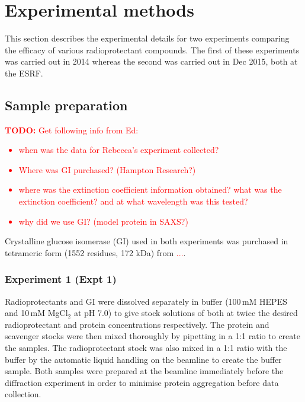 \section{Experimental methods}
\label{sec:Experimental methods - SAXS}
This section describes the experimental details for two experiments comparing the efficacy of various radioprotectant compounds.
The first of these experiments was carried out in 2014 whereas the second was carried out in Dec 2015, both at the ESRF.

\subsection{Sample preparation}
\label{sub:Sample preparation}
\textcolor{red}{
    \begin{myenumerate}
        \item \hypertarget{todo:Need info from Ed}{\textbf{TODO:} Get following info from Ed:}
        \begin{itemize}
            \item when was the data for Rebecca's experiment collected?
            \item Where was GI purchased? (Hampton Research?)
            \item where was the extinction coefficient information obtained? what was the extinction coefficient? and at what wavelength was this tested?
            \item why did we use GI? (model protein in SAXS?)
        \end{itemize}
    \end{myenumerate}
}
Crystalline glucose isomerase (GI) used in both experiments was purchased in tetrameric form (1552 residues, 172 kDa) from \textcolor{red}{...}.

\subsubsection{Experiment 1 (Expt 1)}
\label{subs:Experiment 1 - sample prep}
Radioprotectants and GI were dissolved separately in buffer (100$\,$mM HEPES and 10$\,$mM MgCl$_2$ at pH 7.0) to give stock solutions of both at twice the desired radioprotectant and protein concentrations respectively.
The protein and scavenger stocks were then mixed thoroughly by pipetting in a 1:1 ratio to create the samples.
The radioprotectant stock was also mixed in a 1:1 ratio with the buffer by the automatic liquid handling on the beamline to create the buffer sample.
Both samples were prepared at the beamline immediately before the diffraction experiment in order to minimise protein aggregation before data collection.

